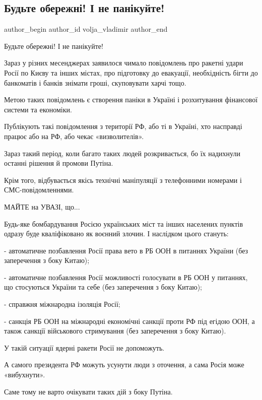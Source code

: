  
 
 
 
 
 
\subsection{Будьте обережні! І не панікуйте!}
\label{sec:23_02_2022.tg.volja_vladimir.1.budjte_oberezhni}
 
\ifcmt
 author_begin
   author_id volja_vladimir
 author_end
\fi

Будьте обережні! І не панікуйте!  

Зараз у різних месенджерах заявилося чимало повідомлень про ракетні удари Росії
по Києву та інших містах, про підготовку до евакуації, необхідність бігти до
банкоматів і банків знімати гроші, скуповувати  харчі тощо.

Метою таких повідомлень є створення паніки в Україні і розхитування фінансової
системи та економіки.  

Публікують такі повідомлення з території РФ, або ті в Україні, хто насправді
працює або на РФ, або чекає «визволителів». 

Зараз такий період, коли багато таких людей розкривається, бо їх надихнули
останні рішення й промови Путіна. 

Крім того, відбувається якісь технічні маніпуляції з телефонними номерами і
СМС-повідомленнями.

МАЙТЕ на УВАЗІ, що...

Будь-яке бомбардування Росією українських міст та інших населених пунктів
одразу буде кваліфіковано як воєнний злочин. І наслідком цього стануть:

- автоматичне позбавлення Росії права вето в РБ ООН в питаннях України (без
заперечення з боку Китаю);

- автоматичне позбавлення Росії можливості голосувати в РБ ООН у питаннях, що
стосуються України та себе (без заперечення з боку Китаю);

- справжня міжнародна ізоляція Росії;

- санкція РБ ООН на міжнародні економічні санкції проти РФ під егідою ООН, а
також санкції військового стримування (без заперечення з боку Китаю).

У такій ситуації ядерні ракети Росії не допоможуть. 

А самого президента РФ можуть усунути люди з оточення, а сама Росія може
«вибухнути». 

Саме тому не варто очікувати таких дій з боку Путіна.
